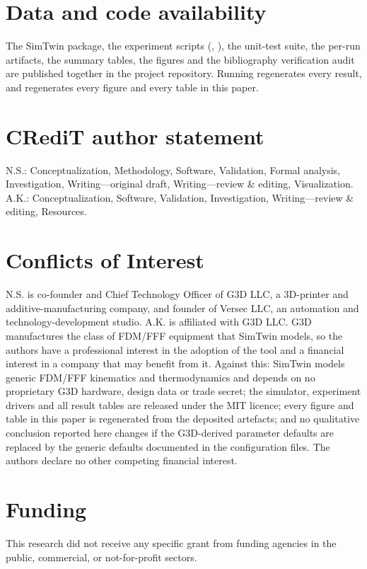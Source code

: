 \documentclass[preprint,12pt,authoryear,nopreprintline]{elsarticle}
\newcommand{\smt}{SimTwin}
\begin{document}
\section*{Data and code availability}
The \smt{} package, the experiment scripts
(, ), the
unit-test suite, the per-run artifacts, the summary tables, the figures and the
bibliography verification audit are published together in the project
repository.
Running  regenerates every result, and
 regenerates every figure and every
table in this paper.

\section*{CRediT author statement}
N.S.: Conceptualization, Methodology, Software, Validation, Formal analysis,
Investigation, Writing---original draft, Writing---review \& editing,
Visualization.
A.K.: Conceptualization, Software, Validation, Investigation,
Writing---review \& editing, Resources.

\section*{Conflicts of Interest}
N.S. is co-founder and Chief Technology Officer of G3D LLC, a 3D-printer and
additive-manufacturing company, and founder of Versec LLC, an automation and
technology-development studio. A.K. is affiliated with G3D LLC. G3D manufactures
the class of FDM/FFF equipment that \smt{} models, so the authors have a
professional interest in the adoption of the tool and a financial interest in a
company that may benefit from it. Against this: \smt{} models generic FDM/FFF
kinematics and thermodynamics and depends on no proprietary G3D hardware, design
data or trade secret; the simulator, experiment drivers and all result tables are
released under the MIT licence; every figure and table in this paper is
regenerated from the deposited artefacts; and no qualitative conclusion reported
here changes if the G3D-derived parameter defaults are replaced by the generic
defaults documented in the configuration files. The authors declare no other
competing financial interest.

\section*{Funding}
This research did not receive any specific grant from funding agencies in the
public, commercial, or not-for-profit sectors.
\end{document}
